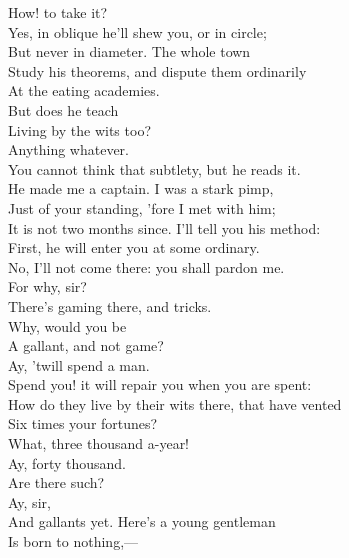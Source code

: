 \documentclass[a4paper,oneside]{memoir}
\begin{document}
\begin{drama*}
\kastrilspeaks {} How! to take it?\\
\facespeaks Yes, in oblique he'll shew you, or in circle;\\
But never in diameter. The whole town\\
Study his theorems, and dispute them ordinarily\\
At the eating academies.\\
\kastrilspeaks {} But does he teach\\
Living by the wits too?\\
\facespeaks {} Anything whatever.\\
You cannot think that subtlety, but he reads it.\\
He made me a captain. I was a stark pimp,\\
Just of your standing, 'fore I met with him;\\
It is not two months since. I'll tell you his method:\\
First, he will enter you at some ordinary.\\
\kastrilspeaks No, I'll not come there: you shall pardon me.\\
\facespeaks For why, sir?\\
\kastrilspeaks {} There's gaming there, and tricks.\\
\facespeaks {} Why, would you be\\
A gallant, and not game?\\
\kastrilspeaks {} Ay, 'twill spend a man.\\
\facespeaks Spend you! it will repair you when you are spent:\\
How do they live by their wits there, that have vented\\
Six times your fortunes?\\
\kastrilspeaks {} What, three thousand a-year!\\
\facespeaks Ay, forty thousand.\\
\kastrilspeaks {} Are there such?\\
\facespeaks {} Ay, sir,\\
And gallants yet. Here's a young gentleman\\
Is born to nothing,---\\

\end{drama*}
\end{document}
